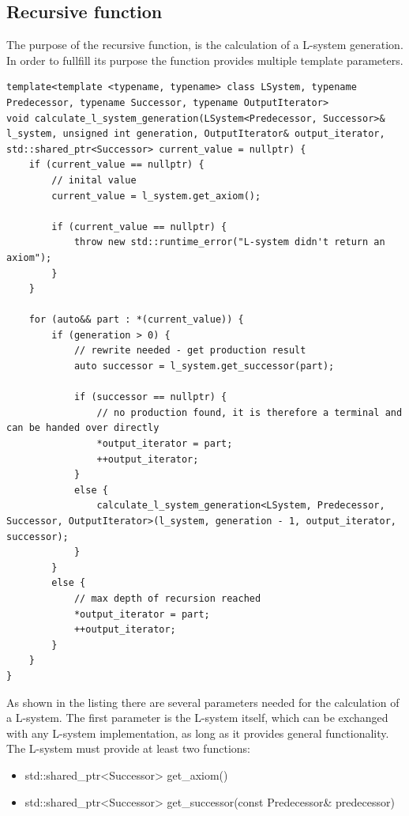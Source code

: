 \documentclass[english]{cpp-hmwk}
\begin{document}
\subsection{Recursive function}
The purpose of the recursive function, is the calculation of a L-system generation. In order to fullfill its purpose the function provides multiple template parameters.

\medskip
\begin{lstlisting}
template<template <typename, typename> class LSystem, typename Predecessor, typename Successor, typename OutputIterator>
void calculate_l_system_generation(LSystem<Predecessor, Successor>& l_system, unsigned int generation, OutputIterator& output_iterator, std::shared_ptr<Successor> current_value = nullptr) {
    if (current_value == nullptr) {
        // inital value
        current_value = l_system.get_axiom();
        
        if (current_value == nullptr) {
            throw new std::runtime_error("L-system didn't return an axiom");
        }
    }

    for (auto&& part : *(current_value)) {
        if (generation > 0) {
            // rewrite needed - get production result
            auto successor = l_system.get_successor(part);

            if (successor == nullptr) {
                // no production found, it is therefore a terminal and can be handed over directly
                *output_iterator = part;
                ++output_iterator;
            }
            else {
                calculate_l_system_generation<LSystem, Predecessor, Successor, OutputIterator>(l_system, generation - 1, output_iterator, successor);
            }
        }
        else {
            // max depth of recursion reached
            *output_iterator = part;
            ++output_iterator;
        }
    }
}

\end{lstlisting}

\noindent As shown in the listing there are several parameters needed for the calculation of a  L-system. The first parameter is the L-system itself, which can be exchanged with any L-system implementation, as long as it provides general functionality. The L-system must provide at least two functions:

\begin{itemize}
\item std::shared\_ptr<Successor> get\_axiom()
\item std::shared\_ptr<Successor> get\_successor(const Predecessor\& predecessor)
\end{itemize}
\end{document}
